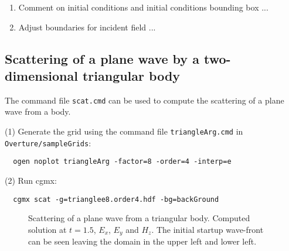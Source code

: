 \documentclass{article}
\begin{document}
\begin{enumerate}
  \item Comment on initial conditions and initial conditions bounding box ...
  \item Adjust boundaries for incident field ...
\end{enumerate}



\clearpage
\subsection{Scattering of a plane wave by a two-dimensional triangular body} \label{sec:scatTri}

The command file {\tt scat.cmd} can be used to compute the scattering
of a plane wave from a body.

\noindent (1) Generate the grid using the command file {\tt triangleArg.cmd} in {\tt Overture/sampleGrids}:
{\small
\begin{verbatim}
  ogen noplot triangleArg -factor=8 -order=4 -interp=e
\end{verbatim}
}
\noindent (2) Run cgmx: 
\begin{verbatim}
  cgmx scat -g=trianglee8.order4.hdf -bg=backGround
\end{verbatim}

{
\begin{figure}[hbt]
\newcommand{\figWidth}{5.5cm}
\newcommand{\trimfig}[2]{\trimFig{#1}{#2}{0.1}{0.05}{.05}{.05}}
\begin{center}
\end{center}
\caption{Scattering of a plane wave from a triangular body. Computed solution at $t=1.5$, $E_x$, $E_y$ and $H_z$. The initial startup wave-front can
     be seen leaving the domain in the upper left and lower left.}
\label{fig:scatTri2d}
\end{figure}
}
\end{document}
